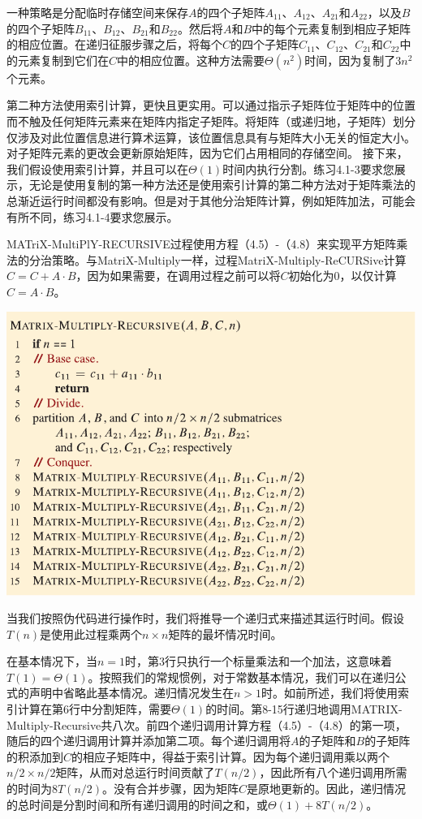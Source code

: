 \documentclass[lang=cn,newtx,10pt,scheme=chinese]{elegantbook}
\begin{document}
一种策略是分配临时存储空间来保存$A$的四个子矩阵$A_{11}$、$A_{12}$、$A_{21}$和$A_{22}$，以及$B$的四个子矩阵$B_{11}$、$B_{12}$、$B_{21}$和$B_{22}$。然后将$A$和$B$中的每个元素复制到相应子矩阵的相应位置。在递归征服步骤之后，将每个$C$的四个子矩阵$C_{11}$、$C_{12}$、$C_{21}$和$C_{22}$中的元素复制到它们在$C$中的相应位置。这种方法需要$\Theta\left(n^2\right)$时间，因为复制了$3n^2$个元素。

第二种方法使用索引计算，更快且更实用。可以通过指示子矩阵位于矩阵中的位置而不触及任何矩阵元素来在矩阵内指定子矩阵。将矩阵（或递归地，子矩阵）划分仅涉及对此位置信息进行算术运算，该位置信息具有与矩阵大小无关的恒定大小。对子矩阵元素的更改会更新原始矩阵，因为它们占用相同的存储空间。
接下来，我们假设使用索引计算，并且可以在$\Theta(1)$时间内执行分割。练习4.1-3要求您展示，无论是使用复制的第一种方法还是使用索引计算的第二种方法对于矩阵乘法的总渐近运行时间都没有影响。但是对于其他分治矩阵计算，例如矩阵加法，可能会有所不同，练习4.1-4要求您展示。

MATriX-MultiPlY-RECURSIVE过程使用方程（4.5）-（4.8）来实现平方矩阵乘法的分治策略。与MatriX-Multiply一样，过程MatriX-Multiply-ReCURSive计算$C=C+A \cdot B$，因为如果需要，在调用过程之前可以将$C$初始化为0，以仅计算$C=A \cdot B$。

\includegraphics{算法导论第四版插图/第四章/递归矩阵相乘算法.pdf}

当我们按照伪代码进行操作时，我们将推导一个递归式来描述其运行时间。假设$T(n)$是使用此过程乘两个$n \times n$矩阵的最坏情况时间。

在基本情况下，当$n=1$时，第3行只执行一个标量乘法和一个加法，这意味着$T(1)=\Theta(1)$。按照我们的常规惯例，对于常数基本情况，我们可以在递归公式的声明中省略此基本情况。递归情况发生在$n>1$时。如前所述，我们将使用索引计算在第6行中分割矩阵，需要$\Theta(1)$的时间。第8-15行递归地调用MATRIX-Multiply-Recursive共八次。前四个递归调用计算方程（4.5）-（4.8）的第一项，随后的四个递归调用计算并添加第二项。每个递归调用将$A$的子矩阵和$B$的子矩阵的积添加到$C$的相应子矩阵中，得益于索引计算。因为每个递归调用乘以两个$n/2 \times n/2$矩阵，从而对总运行时间贡献了$T(n/2)$，因此所有八个递归调用所需的时间为$8 T(n/2)$。没有合并步骤，因为矩阵$C$是原地更新的。因此，递归情况的总时间是分割时间和所有递归调用的时间之和，或$\Theta(1)+8 T(n / 2)$。
\end{document}
